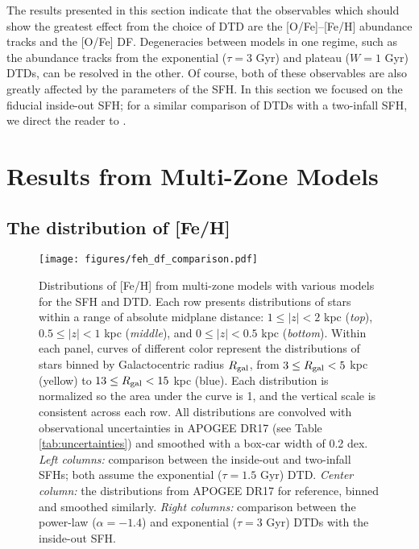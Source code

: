 \documentclass[twocolumn,twocolappendix,linenumbers,trackchanges]{aastex631}
\begin{document}
The results presented in this section indicate that the observables which should show the greatest effect from the choice of DTD are the [O/Fe]--[Fe/H] abundance tracks and the [O/Fe] DF. Degeneracies between models in one regime, such as the abundance tracks from the exponential ($\tau=3$ Gyr) and plateau ($W=1$ Gyr) DTDs, can be resolved in the other. Of course, both of these observables are also greatly affected by the parameters of the SFH. In this section we focused on the fiducial inside-out SFH; for a similar comparison of DTDs with a two-infall SFH, we direct the reader to \citet{Palicio2023-AnalyticDTD}.

\section{Results from Multi-Zone Models}
\label{sec:multizone-results}

\subsection{The distribution of [Fe/H]}
\label{sec:feh-df}

\begin{figure*}
    \centering
    \texttt{[image: figures/feh\_df\_comparison.pdf]}
    \caption{Distributions of [Fe/H] from multi-zone models with various models for the SFH and DTD. Each row presents distributions of stars within a range of absolute midplane distance: $1\leq|z|<2$ kpc (\textit{top}), $0.5\leq|z|<1$ kpc (\textit{middle}), and $0\leq|z|<0.5$ kpc (\textit{bottom}). Within each panel, curves of different color represent the distributions of stars binned by Galactocentric radius $R_{\rm gal}$, from $3\leq R_{\rm gal}<5$ kpc (yellow) to $13\leq R_{\rm gal}<15$ kpc (blue). Each distribution is normalized so the area under the curve is 1, and the vertical scale is consistent across each row. All distributions are convolved with observational uncertainties in APOGEE DR17 (see Table \ref{tab:uncertainties}) and smoothed with a box-car width of 0.2 dex. 
    \textit{Left columns:} comparison between the inside-out and two-infall SFHs; both assume the exponential ($\tau=1.5$ Gyr) DTD. 
    \textit{Center column:} the distributions from APOGEE DR17 for reference, binned and smoothed similarly.
    \textit{Right columns:} comparison between the power-law ($\alpha=-1.4$) and exponential ($\tau=3$ Gyr) DTDs with the inside-out SFH.}
    \label{fig:feh-df-comparison}
\end{figure*}
\end{document}
